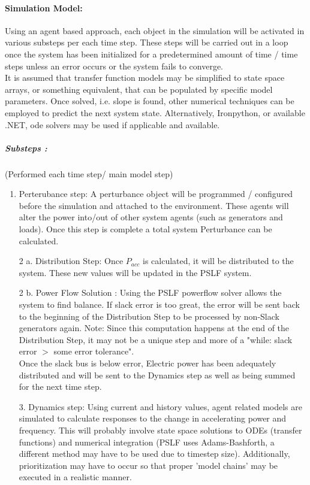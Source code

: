 \documentclass[12pt]{article}
\begin{document}
\paragraph{Simulation Model:}
Using an agent based approach, each object in the simulation will be activated in various substeps per each time step. These steps will be carried out in a loop once the system has been initialized for a predetermined amount of time / time steps unless an error occurs or the system fails to converge.\vspace{1em}\\ 
It is assumed that transfer function models may be simplified to state space arrays, or something equivalent, that can be populated by specific model parameters. Once solved, i.e. slope is found, other numerical techniques can be employed to predict the next system state. Alternatively, Ironpython, or available .NET, ode solvers may be used if applicable and available.
\subparagraph{Substeps :}(Performed each time step/ main model step)
\begin{enumerate}
	\item Perterubance step: A perturbance object will be programmed / configured before the simulation and attached to the environment. These agents will alter the power into/out of other system agents (such as generators and loads). Once this step is complete a total system Perturbance can be calculated.
	\item[2 a.] Distribution Step: Once $P_{acc}$ is calculated, it will be distributed to the system. These new values will be updated in the PSLF system.
	\item[2 b.] Power Flow Solution : Using the PSLF powerflow solver allows the system to find balance. If slack error is too great, the error will be sent back to the beginning of the Distribution Step to be processed  by non-Slack generators again. Note: Since this computation happens at the end of the Distribution Step, it may not be a unique step and more of a "while: slack error $>$ some error tolerance".\\
	Once the slack bus is below error, Electric power has been adequately distributed and will be sent to the Dynamics step as well as being summed for the next time step.
	\item[3.] Dynamics step: Using current and history values, agent related models are simulated to calculate responses to the change in accelerating power and frequency. This will probably involve state space solutions to ODEs (transfer functions) and numerical integration (PSLF uses Adams-Bashforth, a different method may have to be used due to timestep size). Additionally, prioritization may have to occur so that proper 'model chains' may be executed in a realistic manner.
\end{enumerate}
\end{document}
